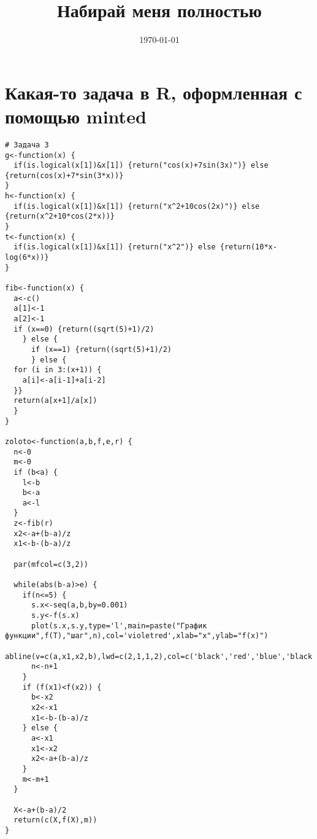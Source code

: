 \documentclass[12pt, a4paper]{article}
\title{Набирай меня полностью}
\date{\today}
\begin{document}
 

\section*{Какая-то задача в R, оформленная с помощью minted}

\begin{verbatim}
# Задача 3
g<-function(x) {
  if(is.logical(x[1])&x[1]) {return("cos(x)+7sin(3x)")} else {return(cos(x)+7*sin(3*x))}
}
h<-function(x) {
  if(is.logical(x[1])&x[1]) {return("x^2+10cos(2x)")} else {return(x^2+10*cos(2*x))}
}
t<-function(x) {
  if(is.logical(x[1])&x[1]) {return("x^2")} else {return(10*x-log(6*x))}
}

fib<-function(x) {
  a<-c()
  a[1]<-1
  a[2]<-1
  if (x==0) {return((sqrt(5)+1)/2)
    } else {
      if (x==1) {return((sqrt(5)+1)/2)
      } else {
  for (i in 3:(x+1)) {
    a[i]<-a[i-1]+a[i-2]
  }}
  return(a[x+1]/a[x])
  }
}

zoloto<-function(a,b,f,e,r) {
  n<-0
  m<-0
  if (b<a) {
    l<-b
    b<-a
    a<-l
  }
  z<-fib(r)
  x2<-a+(b-a)/z
  x1<-b-(b-a)/z
  
  par(mfcol=c(3,2))
  
  while(abs(b-a)>e) {
    if(n<=5) {
      s.x<-seq(a,b,by=0.001)
      s.y<-f(s.x)
      plot(s.x,s.y,type='l',main=paste("График функции",f(T),"шаг",n),col='violetred',xlab="x",ylab="f(x)")
      abline(v=c(a,x1,x2,b),lwd=c(2,1,1,2),col=c('black','red','blue','black'))
      n<-n+1
    }
    if (f(x1)<f(x2)) {
      b<-x2
      x2<-x1
      x1<-b-(b-a)/z
    } else {
      a<-x1
      x1<-x2
      x2<-a+(b-a)/z
    }
    m<-m+1
  }
  
  X<-a+(b-a)/2
  return(c(X,f(X),m))
}

\end{verbatim}
\end{document}
